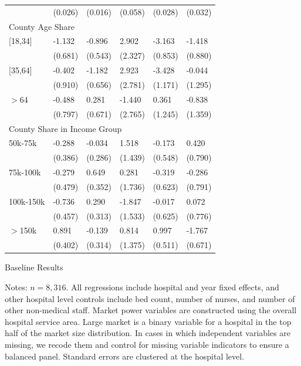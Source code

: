 \documentclass[12pt]{article}
\begin{document}
{\begin{tabular}{llllll}
							&	(0.026)	&	(0.016)	&	(0.058)	&	(0.028)	&	(0.032)	\\
\multicolumn{6}{l}{County Age Share}\\											
\hspace{0.1in}[18,34]			&	-1.132 	&	-0.896 	&	2.902	&	-3.163   	&	-1.418	\\
							&	(0.681)	&	(0.543)	&	(2.327)	&	(0.853)	&	(0.880)	\\
\hspace{0.1in}[35,64]			&	-0.402	&	-1.182 	&	2.923	&	-3.428   	&	-0.044	\\
							&	(0.910)&	(0.656)	&	(2.781)	&	(1.171)	&	(1.295)	\\
\hspace{0.1in} $>$64			&	-0.488	&	0.281	&	-1.440	&	0.361	&	-0.838	\\
							&	(0.797)	&	(0.671)	&	(2.765)	&	(1.245)	&	(1.359)	\\
\multicolumn{6}{l}{County Share in Income Group}\\											
\hspace{0.1in} 50k-75k			&	-0.288	&	-0.034	&	1.518	&	-0.173	&	0.420	\\
							&	(0.386)	&	(0.286)	&	(1.439)	&	(0.548)	&	(0.790)	\\
\hspace{0.1in} 75k-100k			&	-0.279	&	0.649 	&	0.281	&	-0.319	&	-0.286	\\
							&	(0.479)	&	(0.352)	&	(1.736)	&	(0.623)	&	(0.791)	\\
\hspace{0.1in} 100k-150k			&	-0.736	&	0.290	&	-1.847	&	-0.017	&	0.072	\\
							&	(0.457)	&	(0.313)	&	(1.533)	&	(0.625)	&	(0.776)	\\
\hspace{0.1in}$>$150k			&	0.891  	&	-0.139	&	0.814	&	0.997 	&	-1.767   	\\
							&	(0.402)	&	(0.314)	&	(1.375)	&	(0.511)	&	(0.671)	\\
\hline
\end{tabular}
}
\setlength{\captionmargin}{.5 \textwidth} \addtolength{\captionmargin}{-.5\wd\gfxbox}
\begin{table}[htbp!]
\centering
\caption{Baseline Results}
\label{tab:baselineresults}
\usebox{\gfxbox}
\par
\begin{minipage}{\wd\gfxbox}
\footnotesize
Notes: $n=8,316$.  All regressions include hospital and year fixed effects, and other hospital level controls include bed count, number of nurses, and number of other non-medical staff.  Market power variables are constructed using the overall hospital service area.  Large market is a binary variable for a hospital in the top half of the market size distribution.  In cases in which independent variables are missing, we recode them and control for missing variable indicators to ensure a balanced panel.  Standard errors are clustered at the hospital level.
\end{minipage}
\end{table}
\end{document}
